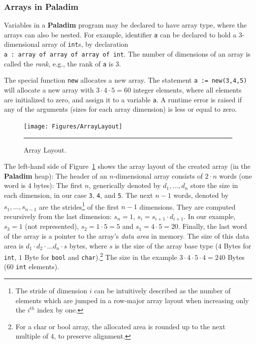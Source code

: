 \documentclass[12pt,a4paper]{article}
\newcommand{\paladim}{\textbf{Paladim}\xspace}
\begin{document}
\subsubsection{Arrays in \paladim}
\label{sec:arraylayout}

Variables in a \paladim program may be declared to have array type, where
the arrays can also be nested.
For example, identifier \texttt{a} can be declared to hold a $3$-dimensional
array of \texttt{int}s, by declaration \texttt{a~:~array~of~array~of~array~of~int}.
The number of dimensions of an array is called the {\em rank},
e.g., the rank of \texttt{a} is $3$.

The special function {\tt new} allocates a new array.
The statement \texttt{a := new(3,4,5)}
will allocate a new array with $3\cdot 4 \cdot 5 = 60$ integer elements, where
all elements are initialized to zero, and assign it to a variable \texttt{a}.
A runtime error is raised if any of the arguments (sizes for each array
dimension) is less or equal to zero.

\begin{figure}[h]%
\texttt{[image: Figures/ArrayLayout]}
\hrule
\vspace*{-1ex}
\caption{Array Layout.}
\label{fig:ArrLayout} %
\vspace*{-1ex}
\end{figure}

The left-hand side of Figure~\ref{fig:ArrLayout} shows the array layout of
the created array (in the \paladim heap): The header of an $n$-dimensional
array consists of $2\cdot n$ words (one word is $4$ bytes):
The first $n$, generically denoted by $d_1, \ldots, d_n$ store the size in
each dimension, in our case \texttt{3}, \texttt{4}, and \texttt{5}.
The next $n-1$ words, denoted by $s_1,\ldots, s_{n-1}$ are the strides\footnote{
The stride of dimension $i$ can be intuitively described as
the number of elements which are jumped in a row-major array layout when
increasing only the $i^{th}$ index by one.}
of the first $n-1$ dimensions. They are computed recursively from the last
dimension:
$s_{n} = 1$, $s_i = s_{i+1} \cdot d_{i+1}$.   In our example, $s_3 = 1$
(not represented), $s_2 = 1\cdot 5 = 5$ and $s_1 = 4\cdot 5 = 20$.
Finally, the last word of the array is a pointer to the array's 
\emph{data area} in memory. %
%
The size of this data area is $d_1 \cdot d_2 \cdot \ldots d_n \cdot s$
bytes, where
$s$ is the size of the array base type ($4$ Bytes for \texttt{int},
$1$ Byte for \texttt{bool} and \texttt{char}).\footnote{For a char or bool
array, the allocated area is rounded up to the next multiple of $4$, to
preserve alignment.}
The size in the example
$3 \cdot 4 \cdot 5 \cdot 4 = 240$ Bytes (60 \texttt{int} elements).
\end{document}
